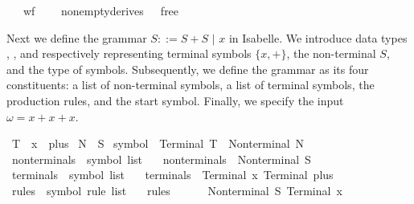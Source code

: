 \begin{isabellebody}
\ \ \ {\isachardoublequoteopen}wf{\isacharunderscore}{\kern0pt}{\isasymG}\ {\isasymG}{\isachardoublequoteclose}\isanewline
\ \ \ {\isachardoublequoteopen}nonempty{\isacharunderscore}{\kern0pt}derives\ {\isasymG}\ {\isasymlongleftrightarrow}\ {\isasymepsilon}{\isacharunderscore}{\kern0pt}free\ {\isasymG}{\isachardoublequoteclose}%
\isadelimproof
%
\endisadelimproof
%
\isatagproof
%
\endisatagproof
{\isafoldproof}%
%
\isadelimproof
%
\endisadelimproof
%
\begin{isamarkuptext}%
Next we define the grammar $S ::= S + S \,\, | \,\, x$ in Isabelle. We introduce data types , , and 
respectively representing terminal symbols $\{x, +\}$, the non-terminal $S$, and the type of symbols.
Subsequently, we define the grammar as its four constituents: a list of non-terminal symbols, a list of terminal symbols,
the production rules, and the start symbol. Finally, we specify the input $\omega = x + x + x$.%
\end{isamarkuptext}\isamarkuptrue%
\isamarkupfalse%
\ T\ {\isacharequal}{\kern0pt}\ x\ {\isacharbar}{\kern0pt}\ plus\isanewline
{}\isamarkupfalse%
\ N\ {\isacharequal}{\kern0pt}\ S\isanewline
{}\isamarkupfalse%
\ symbol\ {\isacharequal}{\kern0pt}\ Terminal\ T\ {\isacharbar}{\kern0pt}\ Nonterminal\ N\isanewline
\isanewline
{}\isamarkupfalse%
\ nonterminals\ {\isacharcolon}{\kern0pt}{\isacharcolon}{\kern0pt}\ {\isachardoublequoteopen}symbol\ list{\isachardoublequoteclose}\ \isanewline
\ \ {\isachardoublequoteopen}nonterminals\ {\isacharequal}{\kern0pt}\ {\isacharbrackleft}{\kern0pt}Nonterminal\ S{\isacharbrackright}{\kern0pt}{\isachardoublequoteclose}\isanewline
\isanewline
{}\isamarkupfalse%
\ terminals\ {\isacharcolon}{\kern0pt}{\isacharcolon}{\kern0pt}\ {\isachardoublequoteopen}symbol\ list{\isachardoublequoteclose}\ \isanewline
\ \ {\isachardoublequoteopen}terminals\ {\isacharequal}{\kern0pt}\ {\isacharbrackleft}{\kern0pt}Terminal\ x{\isacharcomma}{\kern0pt}\ Terminal\ plus{\isacharbrackright}{\kern0pt}{\isachardoublequoteclose}\isanewline
\isanewline
{}\isamarkupfalse%
\ rules\ {\isacharcolon}{\kern0pt}{\isacharcolon}{\kern0pt}\ {\isachardoublequoteopen}symbol\ rule\ list{\isachardoublequoteclose}\ \isanewline
\ \ {\isachardoublequoteopen}rules\ {\isacharequal}{\kern0pt}\ {\isacharbrackleft}{\kern0pt}\isanewline
\ \ \ \ {\isacharparenleft}{\kern0pt}Nonterminal\ S{\isacharcomma}{\kern0pt}\ {\isacharbrackleft}{\kern0pt}Terminal\ x{\isacharbrackright}{\kern0pt}{\isacharparenright}{\kern0pt}{\isacharcomma}{\kern0pt}\isanewline

\end{isabellebody}
